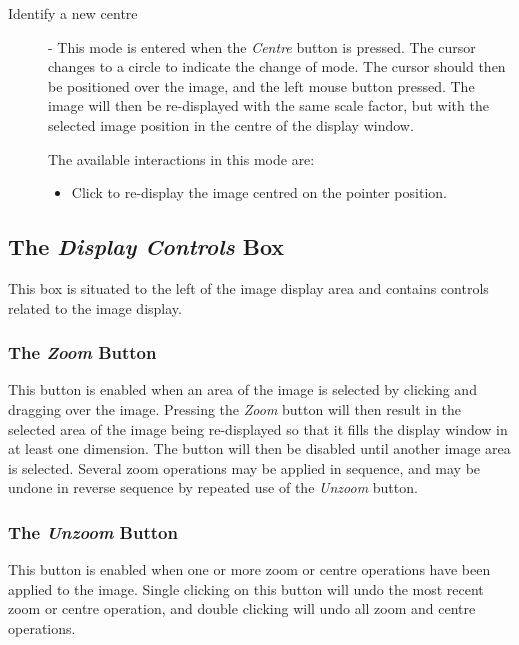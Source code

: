 \documentclass[11pt]{article}
\newcommand{\htmlref}[2]{#1}
\newcommand{\xlabel}[1]{}
\newcommand{\mylabel}[1] {\xlabel{#1}\label{#1}}
\begin{document}
\begin{description}
\item [\mylabel{POLKA_MODE_4} Identify a new centre] - This mode is
entered when the \htmlref{\emph{Centre}}{POLKA_CENTRE} button is pressed.
The cursor changes to a circle to indicate the change of mode. The cursor
should then be positioned over the image, and the left mouse button
pressed. The image will then be re-displayed with the same scale factor,
but with the selected image position in the centre of the display window.

The available interactions in this mode are:
\begin{itemize}
\item Click to re-display the image centred on the pointer position.
\end{itemize}

\end{description}

\subsection {\mylabel{POLKA_DISPLAY_CONTROLS}The \emph{Display Controls} Box}
This box is situated to the left of the \htmlref{image display
area}{POLKA_IMAGE_DISPLAY} and contains controls related to the image
display.

\subsubsection {\mylabel{POLKA_ZOOM}The \emph{Zoom} Button}
This button is enabled when an area of the image is selected by clicking
and dragging over the image. Pressing the \emph{Zoom} button will then
result in the selected area of the image being re-displayed so that it
fills the display window in at least one dimension. The button will then
be disabled until another image area is selected. Several zoom operations
may be applied in sequence, and may be undone in reverse sequence by
repeated use of the \htmlref{\emph{Unzoom}}{POLKA_UNZOOM} button.

\subsubsection {\mylabel{POLKA_UNZOOM}The \emph{Unzoom} Button}
This button is enabled when one or more zoom or centre operations have
been applied to the image. Single clicking on this button will undo the
most recent zoom or centre operation, and double clicking will undo
all zoom and centre operations.
\end{document}
